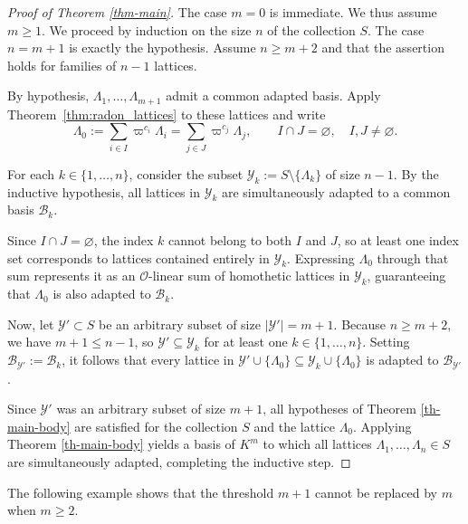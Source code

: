 \documentclass[12pt]{amsart}
\theoremstyle{definition}
\theoremstyle{remark}
\begin{document}
\begin{proof}[Proof of Theorem \ref{thm-main}]
The case $m=0$ is immediate. We thus assume $m\geq1$. 
We proceed by induction on the size $n$ of the collection $S$. The case $n=m+1$ is exactly the hypothesis. Assume $n\geq m+2$ and that the assertion holds for families of $n-1$ lattices.

By hypothesis, $\Lambda_1,\ldots,\Lambda_{m+1}$ admit a
common adapted basis. Apply Theorem~\ref{thm:radon_lattices} to these lattices
and write
\[
  \Lambda_0:=\sum_{i\in I}\varpi^{c_i}\Lambda_i
           =\sum_{j\in J}\varpi^{c_j}\Lambda_j,
  \qquad I\cap J=\varnothing,
  \quad I,J\neq\varnothing.
\]

For each $k \in \{1, \dots, n\}$, consider the subset $\mathcal{Y}_k := S \setminus \{\Lambda_k\}$ of size $n-1$. By the inductive hypothesis, all lattices in $\mathcal{Y}_k$ are simultaneously adapted to a common basis $\mathcal{B}_k$. 

Since $I \cap J = \varnothing$, the index $k$ cannot belong to both $I$ and $J$, so at least one index set corresponds to lattices contained entirely in $\mathcal{Y}_k$. Expressing $\Lambda_0$ through that sum represents it as an $\mathcal{O}$-linear sum of homothetic lattices in $\mathcal{Y}_k$, guaranteeing that $\Lambda_0$ is also adapted to $\mathcal{B}_k$.

Now, let $\mathcal{Y}' \subset S$ be an arbitrary subset of size $|\mathcal{Y}'| = m+1$. Because $n \ge m+2$, we have $m+1 \le n-1$, so $\mathcal{Y}' \subseteq \mathcal{Y}_k$ for at least one $k \in \{1, \dots, n\}$. Setting $\mathcal{B}_{\mathcal{Y}'} := \mathcal{B}_k$, it follows that every lattice in $\mathcal{Y}' \cup \{\Lambda_0\} \subseteq \mathcal{Y}_k \cup \{\Lambda_0\}$ is adapted to $\mathcal{B}_{\mathcal{Y}'}$.

Since $\mathcal{Y}'$ was an arbitrary subset of size $m+1$, all hypotheses of Theorem \ref{th-main-body} are satisfied for the collection $S$ and the lattice $\Lambda_0$. Applying Theorem \ref{th-main-body} yields a basis of $K^m$ to which all lattices $\Lambda_1, \dots, \Lambda_n \in S$ are simultaneously adapted, completing the inductive step.
\end{proof}

    
    

    
    

 The following example shows that the threshold $m+1$ cannot be replaced by $m$ when $m\geq2$.
\end{document}
